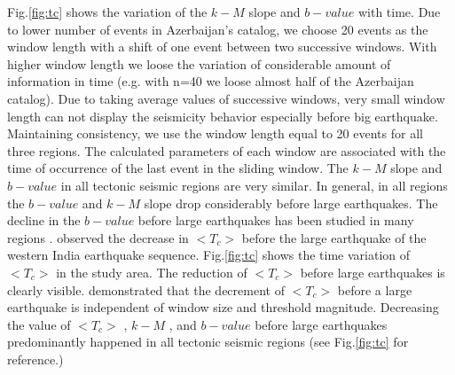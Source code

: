 \noindent
Fig.\ref{fig:tc} shows the variation of the  $k-M$  slope and  $b-value$  with time. Due to lower number of events in Azerbaijan's catalog, we choose 20 events as the window length with a shift of one event between two successive windows. With higher window length we loose the variation of considerable amount of information in time (e.g. with n=40 we loose almost half of the Azerbaijan catalog). Due to taking average values of successive windows, very small window length can not display the seismicity behavior especially before big earthquake. Maintaining consistency, we use the window length equal to 20 events for all three regions. The calculated parameters of each window are associated with the time of occurrence of the last event in the sliding window. The  $k-M$  slope and  $b-value$  in all tectonic seismic regions are very similar. In general, in all regions the $b-value$  and  $k-M$  slope drop considerably before large earthquakes. The decline in the  $b-value$  before large earthquakes has been studied in many regions \citep{Wyss2000, Wyss2006, Schorlemmer2005, Chan2012}.
\noindent
\citet{Telesca2016}  observed the decrease in  $<T_c>$  before the large earthquake of the western India earthquake sequence. Fig.\ref{fig:tc}  shows the time variation of  $<T_c>$   in the study area. The reduction of  $<T_c>$   before large earthquakes is clearly visible.  \citet{Telesca2016}  demonstrated that the decrement of  $<T_c>$   before a large earthquake is independent of window size and threshold magnitude. Decreasing the value of  $<T_c>$  ,  $k-M$ , and  $b-value$  before large earthquakes predominantly happened in all tectonic seismic regions (see Fig.\ref{fig:tc} for reference.)
 
